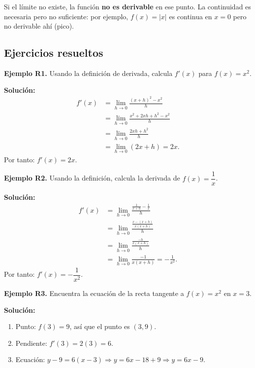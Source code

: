 \documentclass[12pt, letterpaper]{article}
\begin{document}
\begin{cuadroadvertencia}
  Si el límite no existe, la función \textbf{no es derivable} en ese punto. La continuidad es necesaria pero no suficiente: por ejemplo, $f(x) = |x|$ es continua en $x = 0$ pero no derivable ahí (pico).
\end{cuadroadvertencia}

\subsection{Ejercicios resueltos}

\textbf{Ejemplo R1.} Usando la definición de derivada, calcula $f'(x)$ para $f(x) = x^2$.

\begin{cuadrosolucion}
  \textbf{Solución:}
  \begin{align*}
    f'(x) & = \lim_{h \to 0} \frac{(x + h)^2 - x^2}{h}       \\
          & = \lim_{h \to 0} \frac{x^2 + 2xh + h^2 - x^2}{h} \\
          & = \lim_{h \to 0} \frac{2xh + h^2}{h}             \\
          & = \lim_{h \to 0} (2x + h) = 2x.
  \end{align*}
  Por tanto: $f'(x) = 2x$.
\end{cuadrosolucion}

\textbf{Ejemplo R2.} Usando la definición, calcula la derivada de $f(x) = \dfrac{1}{x}$.

\begin{cuadrosolucion}
  \textbf{Solución:}
  \begin{align*}
    f'(x) & = \lim_{h \to 0} \frac{\frac{1}{x + h} - \frac{1}{x}}{h} \\
          & = \lim_{h \to 0} \frac{\frac{x - (x + h)}{x(x + h)}}{h}  \\
          & = \lim_{h \to 0} \frac{\frac{-h}{x(x + h)}}{h}           \\
          & = \lim_{h \to 0} \frac{-1}{x(x + h)} = -\frac{1}{x^2}.
  \end{align*}
  Por tanto: $f'(x) = -\dfrac{1}{x^2}$.
\end{cuadrosolucion}

\textbf{Ejemplo R3.} Encuentra la ecuación de la recta tangente a $f(x) = x^2$ en $x = 3$.

\begin{cuadrosolucion}
  \textbf{Solución:}
  \begin{enumerate}
    \item Punto: $f(3) = 9$, así que el punto es $(3, 9)$.
    \item Pendiente: $f'(3) = 2(3) = 6$.
    \item Ecuación: $y - 9 = 6(x - 3) \Rightarrow y = 6x - 18 + 9 \Rightarrow y = 6x - 9$.
  \end{enumerate}
\end{cuadrosolucion}
\end{document}
